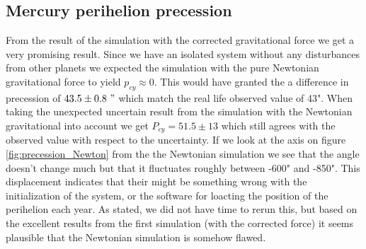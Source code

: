 \documentclass[american,a4paper,12pt]{article}
\begin{document}
\subsection{Mercury perihelion precession}
From the result of the simulation with the corrected gravitational force we get a very promising result. Since we have an isolated system without any disturbances from other planets we expected the simulation with the pure Newtonian gravitational force to yield $p_{cy} \approx 0$. This would have granted the a difference in precession of $43.5 \pm 0.8 \ "$ which match the real life observed value of 43". When taking the unexpected uncertain result from the simulation with the Newtonian gravitational into account we get $P_{cy} = 51.5 \pm 13$ which still agrees with the observed value with respect to the uncertainty. If we look at the axis on figure \ref{fig:precession_Newton} from the the Newtonian simulation we see that the angle doesn't change much but that it fluctuates roughly between -600" and -850". This displacement indicates that their might be something wrong with the initialization of the system, or the software for loacting the position of the perihelion each year. As stated, we did not have time to rerun this, but based on the excellent results from the first simulation (with the corrected force) it seems plausible that the Newtonian simulation is somehow flawed. 
\end{document}
